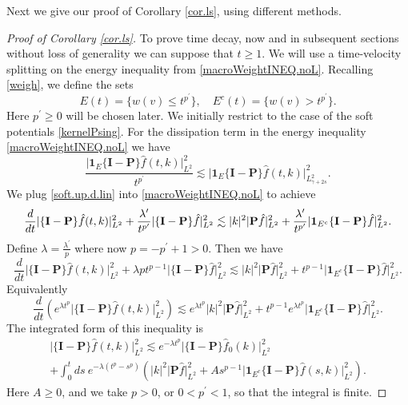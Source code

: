 \documentclass{amsart}
\numberwithin{equation}{section}
\begin{document}
Next we give our proof of Corollary \ref{cor.ls}, using different methods.

\begin{proof}[Proof of Corollary \ref{cor.ls}]  To prove time decay, now and in subsequent sections
without loss of generality we can suppose that $t\ge 1$.  
We will use a time-velocity splitting on the energy inequality from \eqref{macroWeightINEQ.noL}.  Recalling \eqref{weigh}, we define the sets
\begin{equation}
E(t) = \{w(v)\le  t^{p^\prime}\}, \quad  E^c(t)= \{ w(v) >  t^{p^\prime}\}.
\label{split.E}
\end{equation}
Here $p^\prime\ge 0$ will be chosen later. We initially restrict to the case of the soft potentials \eqref{kernelPsing}.  
For the dissipation term in the energy inequality \eqref{macroWeightINEQ.noL} we have
\begin{equation}
\frac{{|} { {\mathbf 1}}_E \{{\mathbf{I}}-{\mathbf{P}}\}\hat{f}(t,k){|}^2_{L^2}}{ t^{p^\prime} }
\lesssim 
{|} { {\mathbf 1}}_E \{{\mathbf{I}}-{\mathbf{P}}\}\hat{f}(t,k){|}^2_{L^2_{\gamma+2s}}.
\label{soft.up.d.lin}
\end{equation}
We plug \eqref{soft.up.d.lin} into \eqref{macroWeightINEQ.noL} to achieve
\begin{equation}\notag
\frac{d}{dt}{|} \{{\mathbf{I}}-{\mathbf{P}}\}\hat{f}(t,k){|}^2_{L^2} 
+
\frac{{\lambda}^\prime}{t^{p^\prime} } {|} \{{\mathbf{I}}-{\mathbf{P}}\}\hat{f}{|}^2_{L^2}
\lesssim
 |k|^2 {|} {\mathbf{P}} \hat{f}{|}^2_{L^2}
 +
 \frac{{\lambda}^\prime}{t^{p^\prime} } {|} { {\mathbf 1}}_{E^c} \{{\mathbf{I}}-{\mathbf{P}}\}\hat{f}{|}^2_{L^2}.
\end{equation}
Define $\lambda= \frac{{\lambda}^\prime}{ p } $ where now $p= -p^\prime+1>0$.  Then we have
\begin{equation*}
\frac{d}{dt}{|} \{{\mathbf{I}}-{\mathbf{P}}\}\hat{f}(t,k){|}^2_{L^2} 
+
\lambda p t^{p-1} {|} \{{\mathbf{I}}-{\mathbf{P}}\}\hat{f}{|}^2_{L^2} 
\lesssim
 |k|^2 {|} {\mathbf{P}} \hat{f}{|}^2_{L^2}
 +
t^{p-1} {|} { {\mathbf 1}}_{E^c} \{{\mathbf{I}}-{\mathbf{P}}\}\hat{f}{|}^2_{L^2}.
\end{equation*}
Equivalently 
\begin{equation*}
\frac{d}{dt}\left(e^{\lambda t^{p}} {|} \{{\mathbf{I}}-{\mathbf{P}}\}\hat{f}(t,k){|}^2_{L^2}   \right) 
\lesssim
e^{\lambda t^p} |k|^2 {|} {\mathbf{P}} \hat{f}{|}^2_{L^2}
+
 t^{p-1} e^{\lambda t^p}
{|} { {\mathbf 1}}_{E^c} \{{\mathbf{I}}-{\mathbf{P}}\}\hat{f}{|}^2_{L^2}.
\end{equation*}
The integrated form of this inequality is 
\begin{multline}
{|} \{{\mathbf{I}}-{\mathbf{P}}\}\hat{f}(t,k){|}^2_{L^2}
\lesssim
e^{-\lambda t^{p}}{|} \{{\mathbf{I}}-{\mathbf{P}}\}\hat{f}_0(k){|}^2_{L^2} 
\\
+   
\int_0^t 
ds ~ e^{-\lambda (t^p-s^p)}
\left( 
|k|^2 {|} {\mathbf{P}} \hat{f}{|}^2_{L^2}
+
{A} s^{p-1} {|} { {\mathbf 1}}_{E^c} \{{\mathbf{I}}-{\mathbf{P}}\}\hat{f}(s,k){|}^2_{L^2}
\right).
\label{main.gs.split.lin}
\end{multline}
Here ${A} \ge 0$, and we take $p>0$, or $0< p^\prime<1$,  so that the integral is finite.    


\end{proof}
\end{document}
